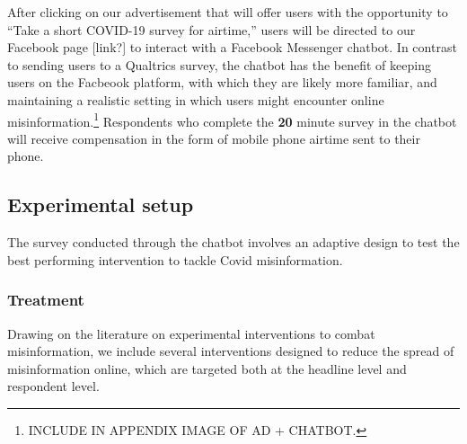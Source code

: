 \documentclass[letterpaper, 12pt, parskip=full, headsepline]{scrartcl}
\begin{document}
After clicking on our advertisement that will offer users with the opportunity to ``Take a short COVID-19 survey for airtime,'' users will be directed to our Facebook page [link?] to interact with a Facebook Messenger chatbot. In contrast to sending users to a Qualtrics survey, the chatbot has the benefit of keeping users on the Facbeook platform, with which they are likely more familiar, and maintaining a realistic setting in which users might encounter online misinformation.\footnote{INCLUDE IN APPENDIX IMAGE OF AD + CHATBOT.} Respondents who complete the \textbf{20} minute survey in the chatbot will receive compensation in the form of mobile phone airtime sent to their phone. 

\subsection{Experimental setup}
The survey conducted through the chatbot involves an adaptive design to test the best performing intervention to tackle Covid misinformation. 

\subsubsection{Treatment}
Drawing on the literature on experimental interventions to combat misinformation, we include several interventions designed to reduce the spread of misinformation online, which are targeted both at the headline level and respondent level. 
\end{document}
